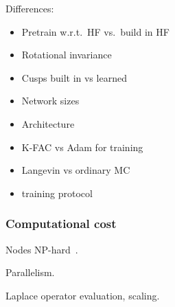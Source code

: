 Differences:
\begin{itemize}
\item Pretrain w.r.t.\ HF vs.\ build in HF
\item Rotational invariance
\item Cusps built in vs learned
\item Network sizes
\item Architecture
\item K-FAC vs Adam for training
\item Langevin vs ordinary MC
\item training protocol
\end{itemize}

\subsubsection{Computational cost}

Nodes NP-hard~\citep{TroyerPRL05}.

Parallelism.

Laplace operator evaluation, scaling.

